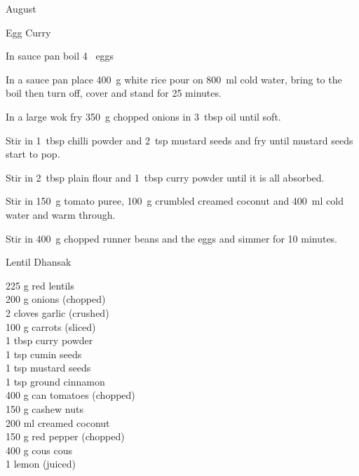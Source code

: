 \begin{menu}{August}
\begin{recipe}{2}{Egg Curry}
    \begin{instructions}
    \item 
        In sauce pan boil
        4~  eggs\item 
      In a
      sauce pan
      place
      400~g  white rice
      pour on
      800~ml  cold water,
      bring to the boil then turn off, cover and stand for 25 minutes.
    \item 
        In a large wok fry
        350~g chopped onions
        in
        3~tbsp  oil
        until soft.
      \item 
        Stir in 1~tbsp  chilli powder
        and
        2~tsp  mustard seeds
        and fry until mustard seeds start to pop.
      \item 
        Stir in
        2~tbsp  plain flour
        and
        1~tbsp  curry powder
        until it is all absorbed.
      \item 
        Stir in
        150~g  tomato puree,
        100~g crumbled creamed coconut
        and
        400~ml  cold water
        and warm through.
      \item 
        Stir in
        400~g chopped runner beans
        and the eggs
        and simmer for 10 minutes.
      
    \end{instructions}
    \end{recipe}%
  
    \begin{recipe}{2}{Lentil Dhansak}%
		\begin{ingredients}
		225 g red lentils  \\
	200 g onions (chopped) \\
	2 cloves garlic (crushed) \\
	100 g carrots (sliced) \\
	1 tbsp curry powder  \\
	1 tsp cumin seeds  \\
	1 tsp mustard seeds  \\
	1 tsp ground cinnamon  \\
	400 g can tomatoes (chopped) \\
	150 g cashew nuts  \\
	200 ml creamed coconut  \\
	150 g red pepper (chopped) \\
	400 g cous cous  \\
	1  lemon (juiced) \\
	
		\end{ingredients}
	

\end{recipe}
\end{menu}
